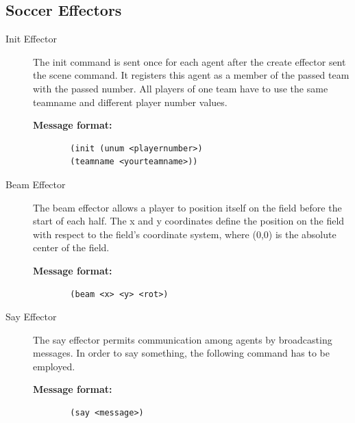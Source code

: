 \subsection{Soccer Effectors}
\begin{description}
  \item [Init Effector]
  The init command is sent once for each agent after the create effector sent the scene command. It registers this agent as a member of the passed team with the passed number. All players of one team have to use the same teamname and different player number values.\cite{SimSpark}
  \begin{description}
  \item[{\bf Message format:}]
  \begin{verbatim}
  (init (unum <playernumber>)
  (teamname <yourteamname>))
  \end{verbatim}
  \end{description}



  \item [Beam Effector]
  The beam effector allows a player to position itself on the field before the start of each half. The x and y coordinates define the position on the field with respect to the field's coordinate system, where (0,0) is the absolute center of the field.\cite{SimSpark}
  \begin{description}
  \item[{\bf Message format:}]
  \begin{verbatim}
  (beam <x> <y> <rot>)
  \end{verbatim}
  \end{description}



  \item [Say Effector]
  The say effector permits communication among agents by broadcasting messages. In order to say something, the following command has to be employed.\cite{SimSpark}
  \begin{description}
  \item[{\bf Message format:}]
  \begin{verbatim}
  (say <message>)
  \end{verbatim}
  \end{description}

\end{description}

